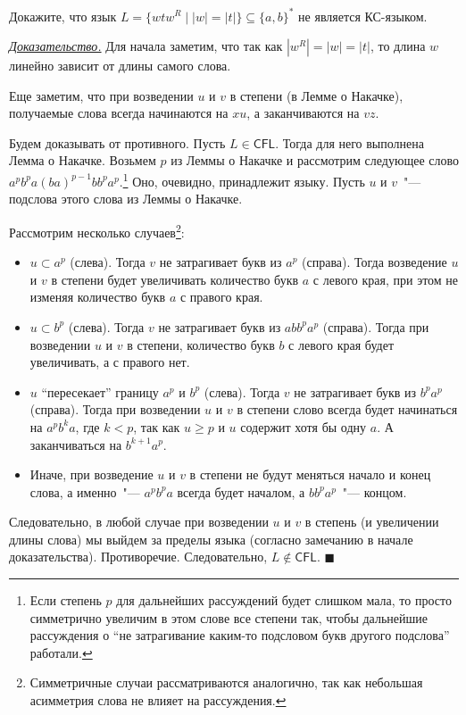\documentclass[10pt]{article}
\newcounter{pr} \setcounter{pr}{0}
\newenvironment{pruf}
  {\par
  {\itshape \underline{Доказательство.}}}
  {\hfill$\blacksquare$}
\renewcommand{\geq}{\geqslant}
\newcommand{\CFL}{\mathsf{CFL}}
\begin{document}
  \begin{pr}
    Докажите, что язык $L = \{ wtw^R \mid |w| = |t|\} \subseteq \{a, b\}^*$ не
    является КС-языком.
    \begin{pruf}
      Для начала заметим, что так как $|w^R| = |w| = |t|$, то длина $w$ линейно
      зависит от длины самого слова.

      Еще заметим, что при возведении $u$ и $v$ в степени (в Лемме о Накачке),
      получаемые слова всегда начинаются на $xu$, а заканчиваются на $vz$.

      Будем доказывать от противного. Пусть $L \in \CFL$. Тогда для него
      выполнена Лемма о Накачке. Возьмем $p$ из Леммы о Накачке и рассмотрим
      следующее слово $a^p b^p a (ba)^{p - 1} b b^p a^p$.\footnote{Если степень
      $p$ для дальнейших рассуждений будет слишком мала, то просто симметрично
      увеличим в этом слове все степени так, чтобы дальнейшие рассуждения о ``не
      затрагивание каким-то подсловом букв другого подслова'' работали.} Оно,
      очевидно, принадлежит языку. Пусть $u$ и $v$~"--- подслова этого слова из
      Леммы о Накачке.

      Рассмотрим несколько случаев\footnote{Симметричные случаи рассматриваются
      аналогично, так как небольшая асимметрия слова не влияет на рассуждения.}:
      \begin{itemize}
        \item $u \subset a^p$ (слева). Тогда $v$ не затрагивает букв из $a^p$
        (справа). Тогда возведение $u$ и $v$ в степени будет увеличивать
        количество букв $a$ с левого края, при этом не изменяя количество букв
        $a$ с правого края.

        \item $u \subset b^p$ (слева). Тогда $v$ не затрагивает букв из $ab b^p
        a^p$ (справа). Тогда при возведении $u$ и $v$ в степени, количество букв
        $b$ с левого края будет увеличивать, а с правого нет.

        \item $u$ ``пересекает'' границу $a^p$ и $b^p$ (слева). Тогда $v$ не
        затрагивает букв из $b^p a^p$ (справа). Тогда при возведении $u$ и $v$ в
        степени слово всегда будет начинаться на $a^p b^k a$, где $k < p$, так
        как $u \geq p$ и $u$ содержит хотя бы одну $a$. А заканчиваться на $b^{k
        + 1} a^p$.

        \item Иначе, при возведение $u$ и $v$ в степени не будут меняться начало
        и конец слова, а именно~"--- $a^p b^p a$ всегда будет началом, а
        $bb^pa^p$~"--- концом.
      \end{itemize}
      Следовательно, в любой случае при возведении $u$ и $v$ в степень (и
      увеличении длины слова) мы выйдем за пределы языка (согласно замечанию в
      начале доказательства). Противоречие. Следовательно, $L \notin \CFL$.
    \end{pruf}
  \end{pr}
\end{document}
